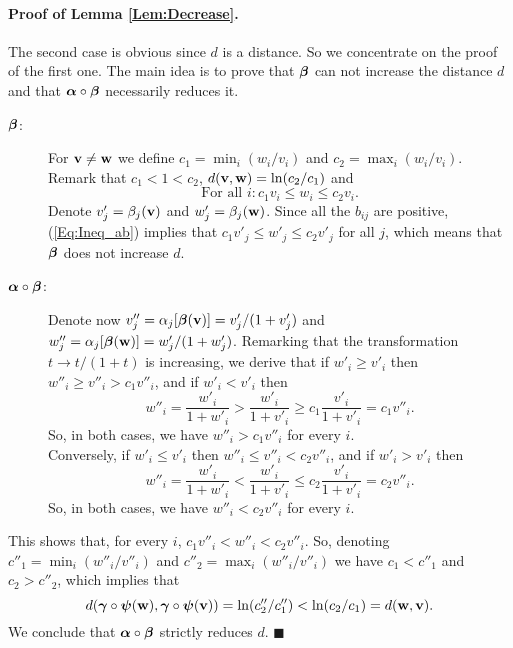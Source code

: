 \documentclass[10pt]{article}
\newcommand{\vbf}{{\bf v}}
\newcommand{\wbf}{{\bf w}}
\newcommand{\alphabf}{\mbox{\mathversion{bold}{$\alpha$}}}
\newcommand{\betabf}{\mbox{\mathversion{bold}{$\beta$}}}
\newcommand{\gammabf}{\mbox{\mathversion{bold}{$\gamma$}}}
\newcommand{\psibf}{\mbox{\mathversion{bold}{$\psi$}}}
\begin{document}
\paragraph{Proof of Lemma {\bf \ref{Lem:Decrease}}.}  The second case
is obvious since $d$ is a distance. So we concentrate on the proof of the first one. The main idea is to prove that  $\betabf$ can not increase the distance
$d$ and that $\alphabf\circ\betabf$ necessarily reduces it.
\begin{description}
\item[$\betabf$:] For $\vbf \neq \wbf$ we define $c_1 = \min_i
  (w_i/v_i)$ and $c_2 = \max_i(w_i/v_i)$. Remark that $c_1 < 1 < c_2$,
  $d(\vbf, \wbf) = \ln(c_2/c_1)$ and
  \begin{equation} \label{Eq:Ineq_ab}
    \mbox{For all } i: c_1 v_i \leq w_i \leq c_2 v_i.
  \end{equation}
  Denote $v'_j = \beta_j(\vbf)$ and $w'_j = \beta_j(\wbf)$. Since all
  the $b_{ij}$ are positive, (\ref{Eq:Ineq_ab}) implies that $c_1 v'_j
  \leq w'_j \leq c_2 v'_j$ for all $j$, which means that $\betabf$
  does not increase $d$.
\item[$\alphabf\circ\betabf$:] Denote now $v''_j =
  \alpha_j[\betabf(\vbf)] = v'_j/(1+v'_j)$ and $w''_j =
  \alpha_j[\betabf(\wbf)] = w'_j/(1+w'_j)$.  Remarking that the
  transformation $t \rightarrow t/(1+t)$ is increasing, we derive that
  if $w'_i \geq v'_i$ then $w''_i \geq v''_i > c_1 v''_i$, and if $
  w'_i < v'_i$ then
  $$
  w''_i = \frac{w'_i}{1+w'_i} > \frac{w'_i}{1+v'_i} \geq c_1
  \frac{v'_i}{1+v'_i} = c_1 v''_i.
  $$
  So, in both cases, we have $w''_i > c_1 v''_i$ for every $i$.\\
  Conversely, if $w'_i \leq v'_i$ then $w''_i \leq v''_i < c_2 v''_i$,
  and if $w'_i > v'_i$ then
  $$
  w''_i = \frac{w'_i}{1+w'_i} < \frac{w'_i}{1+v'_i} \leq c_2
  \frac{v'_i}{1+v'_i} = c_2 v''_i.
  $$
  So, in both cases, we have $w''_i < c_2 v''_i$ for every $i$.\\
\end{description}
This shows that, for every $i$, $c_1 v''_i < w''_i < c_2 v''_i$. So,
denoting $c''_1 = \min_i (w''_i / v''_i)$ and $c''_2 = \max_i (w''_i /
v''_i)$ we have $c_1 < c''_1$ and $c_2 > c''_2$, which implies that
$$
d(\gammabf\circ\psibf(\wbf), \gammabf\circ\psibf(\vbf)) = \ln(c''_2/c''_1) < \ln(c_2/c_1) = d(\wbf, \vbf).
$$
We conclude that $\alphabf\circ\betabf$ strictly reduces $d$.
$\blacksquare$

\end{document}
